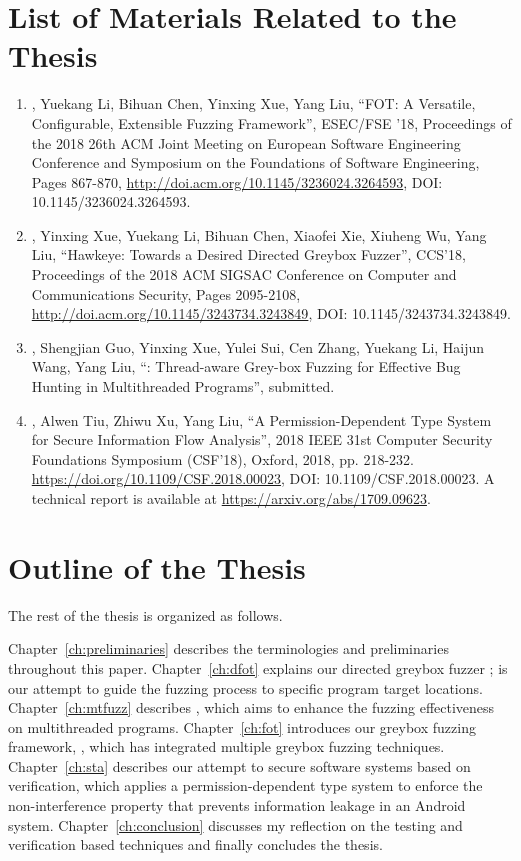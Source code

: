 \section{List of Materials Related to the Thesis}
\begin{enumerate}
        \item \myname, Yuekang Li, Bihuan Chen, Yinxing Xue, Yang Liu, ``FOT: A Versatile, Configurable, Extensible Fuzzing Framework'', ESEC/FSE '18, Proceedings of the 2018 26th ACM Joint Meeting on European Software Engineering Conference and Symposium on the Foundations of Software Engineering, Pages 867-870, \url{http://doi.acm.org/10.1145/3236024.3264593}, DOI: 10.1145/3236024.3264593.
        \item \myname, Yinxing Xue, Yuekang Li, Bihuan Chen, Xiaofei Xie, Xiuheng Wu, Yang Liu, ``Hawkeye: Towards a Desired Directed Greybox Fuzzer'', CCS'18, Proceedings of the 2018 ACM SIGSAC Conference on Computer and Communications Security, Pages 2095-2108, \url{http://doi.acm.org/10.1145/3243734.3243849}, DOI: 10.1145/3243734.3243849.
        \item \myname, Shengjian Guo, Yinxing Xue, Yulei Sui, Cen Zhang, Yuekang Li, Haijun Wang, Yang Liu, ``\mtfuzz: Thread-aware Grey-box Fuzzing for Effective Bug Hunting in Multithreaded Programs'', submitted.
        \item \myname, Alwen Tiu, Zhiwu Xu, Yang Liu, ``A Permission-Dependent Type System for Secure Information Flow Analysis'', 2018 IEEE 31st Computer Security Foundations Symposium (CSF'18), Oxford, 2018, pp. 218-232. \url{https://doi.org/10.1109/CSF.2018.00023}, DOI: 10.1109/CSF.2018.00023. A technical report is available at \url{https://arxiv.org/abs/1709.09623}.
\end{enumerate}

\section{Outline of the Thesis}

The rest of the thesis is organized as follows.

Chapter~\ref{ch:preliminaries} describes the terminologies and preliminaries throughout this paper. Chapter~\ref{ch:dfot} explains our directed greybox fuzzer \dFOT; \dFOT is our attempt to guide the fuzzing process to specific program target locations. Chapter~\ref{ch:mtfuzz} describes \mtfuzz, which aims to enhance the fuzzing effectiveness on multithreaded programs. Chapter~\ref{ch:fot} introduces our greybox fuzzing framework, \FOT, which has integrated multiple greybox fuzzing techniques.  Chapter~\ref{ch:sta} describes our attempt to secure software systems based on verification, which applies a permission-dependent type system to enforce the non-interference property that prevents information leakage in an Android system. Chapter~\ref{ch:conclusion} discusses my reflection on the testing and verification based techniques and finally concludes the thesis.
